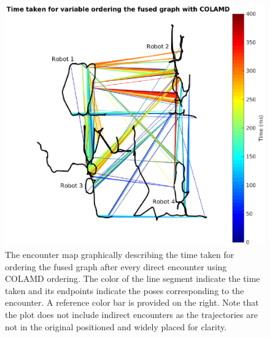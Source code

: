 \begin{figure}
\centering
\includegraphics[width=\textwidth]{Chapters/figures6/colamd_ordering_encounter_colored}
\caption{The encounter map graphically describing the time taken for ordering the fused graph after every direct encounter using COLAMD \cite{colamd} ordering. The color of the line segment indicate the time taken and its endpoints indicate the poses corresponding to the encounter. A reference color bar is provided on the right. Note that the plot does not include indirect encounters as the trajectories are not in the original positioned and widely placed for clarity.}
\label{fig:encounter_colamd}
\end{figure}

